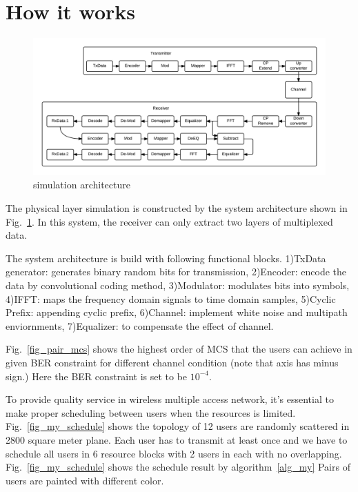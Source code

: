 \section{How it works}
\label{sec_how_it_works}

\begin{figure}[t]
\begin{center}
\includegraphics[width=1.0\columnwidth ,angle=0]{figure/systemArch.png}
\caption{simulation architecture}
\label{fig_sys_arch}
\end{center}
\end{figure}

The physical layer simulation is constructed by the system architecture 
shown in Fig.~\ref{fig_sys_arch}.
In this system, the receiver can only extract two layers of multiplexed data.

The system architecture is build with following functional blocks. 1)TxData 
generator: generates binary random bits for transmission, 2)Encoder: encode 
the data by convolutional coding method, 3)Modulator: modulates bits into
symbols, 4)IFFT: maps the frequency domain signals to time domain samples,
5)Cyclic Prefix: appending cyclic prefix, 6)Channel: implement white noise
and multipath enviornments, 7)Equalizer: to compensate the effect of channel.

Fig.~\ref{fig_pair_mcs} shows the highest order of MCS that the users can
achieve in given BER constraint for different channel condition (note that
axis has minus sign.) Here the BER constraint is set to be $10^{-4}$.

To provide quality service in wireless multiple access
network, it’s essential to make proper scheduling between users
when the resources is limited.
Fig.~\ref{fig_my_schedule} shows the topology of
12 users are randomly scattered in 2800 square meter plane.
Each user has to transmit at least once and we have to schedule all users 
in 6 resource blocks with 2 users in each with no overlapping.
Fig.~\ref{fig_my_schedule} shows the schedule result by algorithm~\ref{alg_my}
Pairs of users are painted with different color.

